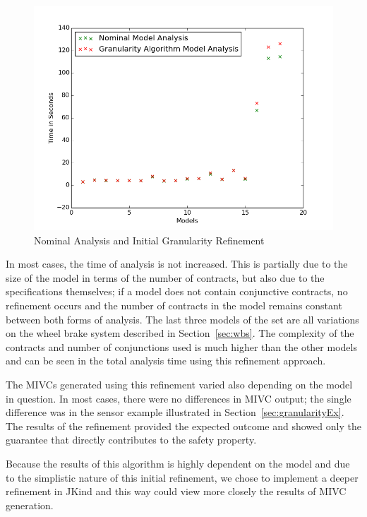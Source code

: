 \begin{figure}[h!]
\begin{center}
\includegraphics[width=.8\textwidth]{images/graphGranularityAND15Models.PNG}
\caption{Nominal Analysis and Initial Granularity Refinement} \label{fig:graphGranularityAND}
\end{center}
\end{figure}

In most cases, the time of analysis is not increased. This is partially due to the size of the model in terms of the number of contracts, but also due to the specifications themselves; if a model does not contain conjunctive contracts, no refinement occurs and the number of contracts in the model remains constant between both forms of analysis. The last three models of the set are all variations on the wheel brake system described in Section~\ref{sec:wbs}. The complexity of the contracts and number of conjunctions used is much higher than the other models and can be seen in the total analysis time using this refinement approach. 

The MIVCs generated using this refinement varied also depending on the model in question. In most cases, there were no differences in MIVC output; the single difference was in the sensor example illustrated in Section~\ref{sec:granularityEx}. The results of the refinement provided the expected outcome and showed only the guarantee that directly contributes to the safety property. 

Because the results of this algorithm is highly dependent on the model and due to the simplistic nature of this initial refinement, we chose to implement a deeper refinement in JKind and this way could view more closely the results of MIVC generation. 